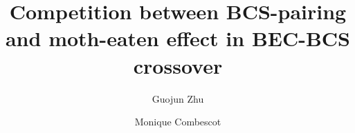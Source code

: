 \documentclass[3p,twocolumn]{elsarticle}
\begin{document}
\title{Competition between BCS-pairing and moth-eaten effect in BEC-BCS crossover}
\author[uiuc]{Guojun Zhu}
\author[uiuc,upmc]{Monique Combescot}

\address[uiuc]{Department of Physics, University of Illinois at Urbana-Champaign, 1110 W Green St, Urbana, IL, 61801}

\address[upmc]{Institut des NanoSciences de Paris, Universite Pierre et Marie Curie, CNRS, Tour 22, 4 place Jussieu, 75005 Paris }
\newcommand{\vk}{\ensuremath{\mathbf{k}}}
\newcommand{\vK}{\ensuremath{\mathbf{K}}}
\providecommand{\vr}{\ensuremath{\mathbf{r}}}

\newcommand{\gk}{\ensuremath{{g}(\mathbf{k})}}

\newcommand{\vp}{\ensuremath{\mathbf{p}}}
\newcommand{\gp}{\ensuremath{{g}(\mathbf{p})}}

\newcommand{\vq}{\ensuremath{\mathbf{q}}}

\newcommand{\Fo}{\ensuremath{\mathbf{F_0}}}


\newcommand{\E}{\ensuremath{\mathbf{E}}}
\newcommand{\A}{\ensuremath{\mathbf{A}}}
\newcommand{\J}{\ensuremath{\mathcal{J}}}

\newcommand{\ket}[1]{\ensuremath{\left|#1\right>}}
\newcommand{\bra}[1]{\ensuremath{\left<#1\right|}}

\newcommand{\twoe}{\ensuremath{2\epsilon_\vk-\E_1}}

\newcommand{\nth}[1]{\ensuremath{\frac{1}{#1}}}

\newcommand{\br}[1]{\ensuremath{\left(#1\right)}}
\newcommand{\mbr}[1]{\ensuremath{\left[#1\right]}}
\newcommand{\bbr}[1]{\ensuremath{\left\{#1\right\}}}


\newcommand{\tk}{\ensuremath{\tilde{k}}}

\newcommand{\kp}{\ensuremath{\ket{\Psi}}}

\newcommand{\av}[1]{\ensuremath{\bigl<{#1}\bigr>}}
\newcommand{\avs}[3] {\av{#1{\lvert{#2}\rvert}#3}}
\newcommand{\avv}[2][\nu] {\avs{#1}{#2}{#1}}
\newcommand{\avt}[2]{\av{{#1}|{#2}}}
\newcommand{\avtu}[1]{\av{T_\tau#1}}
\end{document}
